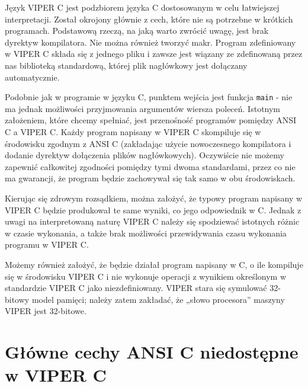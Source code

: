 \documentclass[a4paper,twoside,openright,11pt]{report}
\begin{document}
\par Język VIPER C jest podzbiorem języka C dostosowanym w celu łatwiejszej interpretacji. Został okrojony głównie z cech, które nie są potrzebne w krótkich programach. Podstawową rzeczą, na jaką warto zwrócić uwagę, jest brak dyrektyw kompilatora. Nie można również tworzyć makr. Program zdefiniowany w VIPER C składa się z jednego pliku i zawsze jest wiązany ze zdefinowaną przez nas biblioteką standardową, której plik nagłówkowy jest dołączany automatycznie. 
\par Podobnie jak w programie w języku C, punktem wejścia jest funkcja \texttt{main} - nie ma jednak możliwości przyjmowania argumentów wiersza poleceń. Istotnym założeniem, które chcemy spełniać, jest przenośność programów pomiędzy ANSI C a VIPER C. Każdy program napisany w VIPER C skompiluje się w środowisku zgodnym z ANSI C (zakładając użycie nowoczesnego kompilatora i dodanie dyrektyw dołączenia plików nagłówkowych). Oczywiście nie możemy zapewnić całkowitej zgodności pomiędzy tymi dwoma standardami, przez co nie ma gwarancji, że program będzie zachowywał się tak samo w obu środowiskach. \par Kierując się zdrowym rozsądkiem, można założyć, że typowy program napisany w VIPER C będzie produkował te same wyniki, co jego odpowiednik w C. Jednak z uwagi na interpretowaną naturę VIPER C należy się spodziewać istotnych różnic w czasie wykonania, a także brak możliwości przewidywania czasu wykonania programu w VIPER C. 
\par Możemy również założyć, że będzie działał program napisany w C, o ile kompiluje się w środowisku VIPER C i nie wykonuje operacji z wynikiem określonym w standardzie VIPER C jako niezdefiniowany. VIPER stara się symulować 32-bitowy model pamięci; należy zatem zakładać, że „słowo procesora” maszyny VIPER jest 32-bitowe. 

  \section {Główne cechy ANSI C niedostępne w VIPER C}
\end{document}
